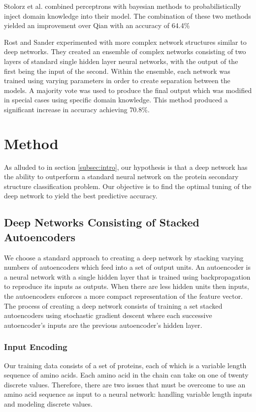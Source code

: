 \documentclass[letterpaper,twocolumn,12pt]{article}
\begin{document}
Stolorz et al. combined perceptrons with bayesian methods to probabilistically inject domain knowledge into their model.
The combination of these two methods yielded an improvement over Qian with an accuracy of 64.4\%

Rost and Sander experimented with more complex network structures similar to deep networks.
They created an ensemble of complex networks consisting of two layers of standard single hidden layer neural networks, with the output of the first being the input of the second.
Within the ensemble, each network was trained using varying parameters in order to create separation between the models.
A majority vote was used to produce the final output which was modified in special cases using specific domain knowledge.
This method produced a significant increase in accuracy achieving 70.8\%.

\section{Method}
As alluded to in section \ref{subsec:intro}, our hypothesis is that a deep network has the ability to outperform a standard neural network on the protein secondary structure classification
problem.
Our objective is to find the optimal tuning of the deep network to yield the best predictive accuracy.

\subsection{Deep Networks Consisting of Stacked Autoencoders}
We choose a standard approach to creating a deep network by stacking varying numbers of autoencoders \cite{Hinton} which feed into a set of output units.
An autoencoder is a neural network with a single hidden layer that is trained using backpropagation to reproduce its inputs as outputs.
When there are less hidden units then inputs, the autoencoders enforces a more compact representation of the feature vector.
The process of creating a deep network consists of training a set stacked autoencoders using stochastic gradient descent where each successive autoencoder's inputs are the previous autoencoder's hidden layer.

\subsubsection{Input Encoding}
Our training data consists of a set of proteins, each of which is a variable length sequence of amino acids.
Each amino acid in the chain can take on one of twenty discrete values.
Therefore, there are two issues that must be overcome to use an amino acid sequence as input to a neural network: handling variable length inputs and modeling discrete values.
\end{document}
